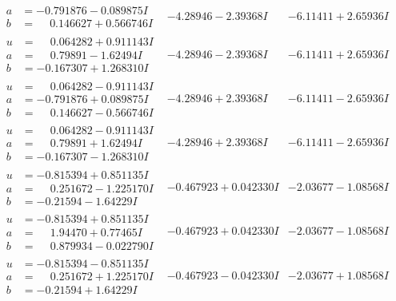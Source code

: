 \documentclass[1p]{elsarticle_modified}
\theoremstyle{definition}
\begin{document}
$$\begin{array}{c|c|c}
\begin{aligned}
a &= -0.791876 - 0.089875 I \\
b &= \phantom{-}0.146627 + 0.566746 I\end{aligned}
 & -4.28946 - 2.39368 I & -6.11411 + 2.65936 I \\ \hline\begin{aligned}
u &= \phantom{-}0.064282 + 0.911143 I \\
a &= \phantom{-}0.79891 - 1.62494 I \\
b &= -0.167307 + 1.268310 I\end{aligned}
 & -4.28946 - 2.39368 I & -6.11411 + 2.65936 I \\ \hline\begin{aligned}
u &= \phantom{-}0.064282 - 0.911143 I \\
a &= -0.791876 + 0.089875 I \\
b &= \phantom{-}0.146627 - 0.566746 I\end{aligned}
 & -4.28946 + 2.39368 I & -6.11411 - 2.65936 I \\ \hline\begin{aligned}
u &= \phantom{-}0.064282 - 0.911143 I \\
a &= \phantom{-}0.79891 + 1.62494 I \\
b &= -0.167307 - 1.268310 I\end{aligned}
 & -4.28946 + 2.39368 I & -6.11411 - 2.65936 I \\ \hline\begin{aligned}
u &= -0.815394 + 0.851135 I \\
a &= \phantom{-}0.251672 - 1.225170 I \\
b &= -0.21594 - 1.64229 I\end{aligned}
 & -0.467923 + 0.042330 I & -2.03677 - 1.08568 I \\ \hline\begin{aligned}
u &= -0.815394 + 0.851135 I \\
a &= \phantom{-}1.94470 + 0.77465 I \\
b &= \phantom{-}0.879934 - 0.022790 I\end{aligned}
 & -0.467923 + 0.042330 I & -2.03677 - 1.08568 I \\ \hline\begin{aligned}
u &= -0.815394 - 0.851135 I \\
a &= \phantom{-}0.251672 + 1.225170 I \\
b &= -0.21594 + 1.64229 I\end{aligned}
 & -0.467923 - 0.042330 I & -2.03677 + 1.08568 I \\ \hline\begin{aligned}

\end{aligned}
\end{array}$$
\end{document}
